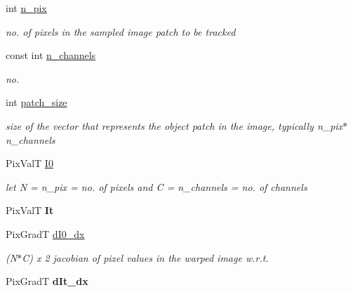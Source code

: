 \begin{DoxyCompactItemize}
\item 
\hypertarget{classImageBase_a01bbe6e54a59a6a54885222225233040}{int \hyperlink{classImageBase_a01bbe6e54a59a6a54885222225233040}{n\-\_\-pix}}\label{classImageBase_a01bbe6e54a59a6a54885222225233040}

\begin{DoxyCompactList}\small\item\em no. of pixels in the sampled image patch to be tracked \end{DoxyCompactList}\item 
const int \hyperlink{classImageBase_ac16eaa560cdf51fc9232ae115c3567e2}{n\-\_\-channels}
\begin{DoxyCompactList}\small\item\em no. \end{DoxyCompactList}\item 
\hypertarget{classImageBase_a71d9ec399436e3c833ad7323670f1ed5}{int \hyperlink{classImageBase_a71d9ec399436e3c833ad7323670f1ed5}{patch\-\_\-size}}\label{classImageBase_a71d9ec399436e3c833ad7323670f1ed5}

\begin{DoxyCompactList}\small\item\em size of the vector that represents the object patch in the image, typically n\-\_\-pix$\ast$n\-\_\-channels \end{DoxyCompactList}\item 
Pix\-Val\-T \hyperlink{classImageBase_a6e5beaedb0a6d8e511446443dc2b80dc}{I0}
\begin{DoxyCompactList}\small\item\em let N = n\-\_\-pix = no. of pixels and C = n\-\_\-channels = no. of channels \end{DoxyCompactList}\item 
\hypertarget{classImageBase_ab681301644f53a0609a53214c93aede0}{Pix\-Val\-T {\bfseries It}}\label{classImageBase_ab681301644f53a0609a53214c93aede0}

\item 
Pix\-Grad\-T \hyperlink{classImageBase_a932c969a6b33c3d3d4e2c120fa8fd815}{d\-I0\-\_\-dx}
\begin{DoxyCompactList}\small\item\em (N$\ast$\-C) x 2 jacobian of pixel values in the warped image w.\-r.\-t. \end{DoxyCompactList}\item 
\hypertarget{classImageBase_a5b86e56c04d2bdfc846764e6ab5c52ee}{Pix\-Grad\-T {\bfseries d\-It\-\_\-dx}}\label{classImageBase_a5b86e56c04d2bdfc846764e6ab5c52ee}


\end{DoxyCompactItemize}
